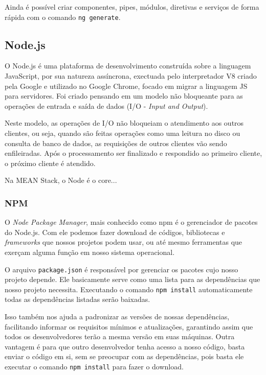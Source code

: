 \documentclass[
	12pt,				%
	openright,			%
	twoside,			%
	a4paper,			%
	english,			%
	brazil				%
	]{abntex2}
\begin{document}

Ainda é possível criar componentes, pipes, módulos, diretivas e serviços de forma rápida com o comando \verb|ng generate|.

\subsection{Node.js}

O Node.js é uma plataforma de desenvolvimento construída sobre a linguagem JavaScript, por sua natureza assíncrona, exectuada pelo interpretador V8 criado pela Google e utilizado no Google Chrome, focado em migrar a linguagem JS para servidores. Foi criado pensando em um modelo não bloqueante para as operações de entrada e saída de dados (I/O - \textit{Input and Output}).

Neste modelo, as operações de I/O não bloqueiam o atendimento aos outros clientes, ou seja, quando são feitas operações como uma leitura no disco ou consulta de banco de dados, as requisições de outros clientes vão sendo enfileiradas. Após o processamento ser finalizado e respondido ao primeiro cliente, o próximo cliente é atendido.

Na MEAN Stack, o Node é o core...

\subsubsection{NPM}

O \textit{Node Package Manager}, mais conhecido como npm é o gerenciador de pacotes do Node.js. Com ele podemos fazer download de códigos, bibliotecas e \textit{frameworks} que nossos projetos podem usar, ou até mesmo ferramentas que exerçam alguma função em nosso sistema operacional.

O arquivo \verb|package.json| é responsável por gerenciar os pacotes cujo nosso projeto depende. Ele basicamente serve como uma lista para as dependências que nosso projeto necessita. Executando o comando \verb|npm install| automaticamente todas as dependências listadas serão baixadas.

Isso também nos ajuda a padronizar as versões de nossas dependências, facilitando informar os requisitos mínimos e atualizações, garantindo assim que todos os desenvolvedores terão a mesma versão em suas máquinas. Outra vantagem é para que outro desenvolvedor tenha acesso a nosso código, basta enviar o código em si, sem se preocupar com as dependências, pois basta ele executar o comando \verb|npm install| para fazer o download.
\end{document}
